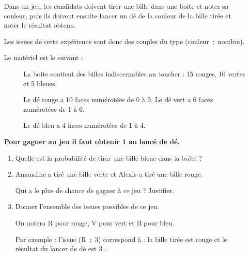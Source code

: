 \documentclass[exercice,a4]{thedocument}%
\begin{document}
%
\providecommand{\degres}{^\circ}%
    \def\red{\color{red}}%
    \def\green{\color{green}}%
    \def\blue{\color{blue}}%
\medskip

Dans un jeu, les candidats doivent tirer une bille dans une boite et noter sa couleur, puis ils doivent ensuite lancer un dé de la couleur de la bille tirée et noter le résultat obtenu.

Les issues de cette expérience sont donc des couples du type (couleur~;~nombre).

Le matériel est le suivant :

\begin{description}
\item[ ] La boite contient des billes indiscernables au toucher :  {\red 15 rouges}, {\green 10 vertes} et  {\blue 5 bleues}.
\item[ ] Le dé rouge a 10 faces numérotées de 0 à 9. Le dé vert a 6 faces numérotées de 1 à 6.
\item[ ] Le dé bleu a 4 faces numérotées de 1 à 4.
\end{description}

\textbf{Pour gagner au jeu il faut obtenir 1 au lancé de dé.}

\begin{enumerate}
\item Quelle est la probabilité de tirer une bille bleue dans la boîte ?
\item Amandine a tiré une bille verte et Alexis a tiré une bille rouge.

Qui a le plus de chance de gagner à ce jeu ? Justifier.
\item Donner l'ensemble des issues possibles de ce jeu.

On notera \og R \fg pour rouge, \og V \fg pour vert et \og B \fg pour bleu.

Par exemple : l'issue (R~;~3) correspond à : \og la bille tirée est rouge et le résultat du lancer de dé est 3 \fg.
\end{enumerate}

\bigskip
\showthesource
\end{document}
